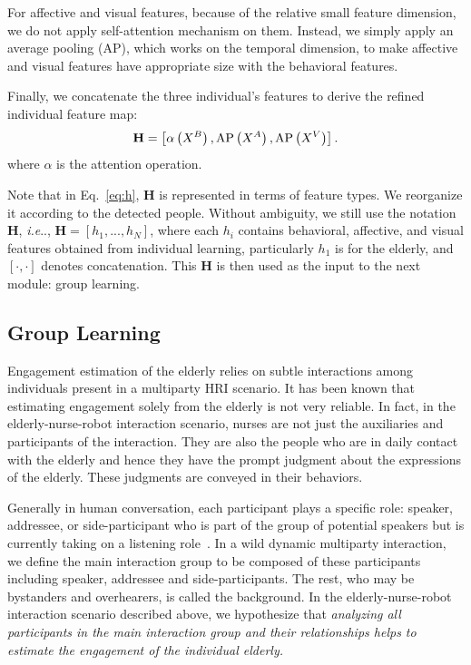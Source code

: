 \documentclass[VANCOUVER,STIX1COL]{WileyNJD-v2}
\makeatletter
\DeclareRobustCommand\onedot{\futurelet\@let@token\@onedot}
\def\@onedot{\ifx\@let@token.\else.\null\fi\xspace}
\def\ie{\emph{i.e}\onedot}
\makeatother
\begin{document}
For affective and visual features, because of the relative small feature dimension, we do not apply self-attention mechanism on them. Instead, we simply apply an average pooling (AP), which works on the temporal dimension, to make affective and visual features have appropriate size with the behavioral features.

Finally, we concatenate the three individual's features to derive the refined individual feature map:
\begin{equation}
\label{eq:h}
  \mathbf{H} = \left[\alpha\left(X^B\right), {\rm AP}\left(X^A\right), {\rm AP}\left(X^V\right)\right].
\end{equation}
where $\alpha$ is the attention operation.

Note that in Eq.~\ref{eq:h}, $\mathbf{H}$ is represented in terms of feature types. We reorganize it according to the detected people. Without ambiguity, we still use the notation $\mathbf{H}$, \ie, $\mathbf{H} = \left[h_1, ..., h_N\right]$, where each $h_i$ contains behavioral, affective, and visual features obtained from individual learning, particularly $h_1$ is for the elderly, and $\left[\cdot, \cdot\right]$ denotes concatenation. This $\mathbf{H}$ is then used as the input to the next module: group learning.


\subsection{Group Learning}
\label{subs:Group_Learning}

Engagement estimation of the elderly relies on subtle interactions among individuals present in a multiparty HRI scenario. It has been known that estimating engagement solely from the elderly is not very reliable. In fact, in the elderly-nurse-robot interaction scenario, nurses are not just the auxiliaries and participants of the interaction. They are also the people who are in daily contact with the elderly and hence they have the prompt judgment about the expressions of the elderly. These judgments are conveyed in their behaviors.

Generally in human conversation, each participant plays a specific role: speaker, addressee, or side-participant who is part of the group of potential speakers but is currently taking on a listening role~\cite{Goffman1981Forms,Clark1996Using}. In a wild dynamic multiparty interaction, we define the main interaction group to be composed of these participants including speaker, addressee and side-participants. The rest, who may be bystanders and overhearers, is called the background.
In the elderly-nurse-robot interaction scenario described above, we hypothesize that \textit{analyzing all participants in the main interaction group and their relationships helps to estimate the engagement of the individual elderly.}
\end{document}
